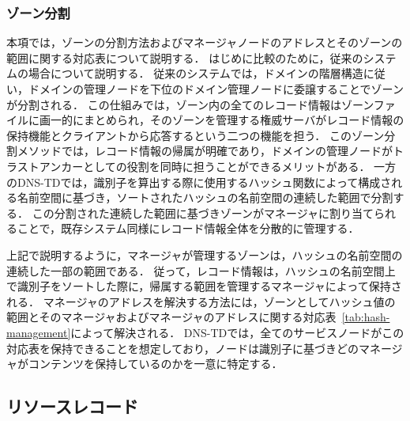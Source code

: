 \subsubsection{ゾーン分割}
本項では，ゾーンの分割方法およびマネージャノードのアドレスとそのゾーンの範囲に関する対応表について説明する．
はじめに比較のために，従来のシステムの場合について説明する．
従来のシステムでは，ドメインの階層構造に従い，ドメインの管理ノードを下位のドメイン管理ノードに委譲することでゾーンが分割される．
この仕組みでは，ゾーン内の全てのレコード情報はゾーンファイルに画一的にまとめられ，そのゾーンを管理する権威サーバがレコード情報の保持機能とクライアントから応答するという二つの機能を担う．
このゾーン分割メソッドでは，レコード情報の帰属が明確であり，ドメインの管理ノードがトラストアンカーとしての役割を同時に担うことができるメリットがある．
一方のDNS-TDでは，識別子を算出する際に使用するハッシュ関数によって構成される名前空間に基づき，ソートされたハッシュの名前空間の連続した範囲で分割する．
この分割された連続した範囲に基づきゾーンがマネージャに割り当てられることで，既存システム同様にレコード情報全体を分散的に管理する．

上記で説明するように，マネージャが管理するゾーンは，ハッシュの名前空間の連続した一部の範囲である．
従って，レコード情報は，ハッシュの名前空間上で識別子をソートした際に，帰属する範囲を管理するマネージャによって保持される．
マネージャのアドレスを解決する方法には，ゾーンとしてハッシュ値の範囲とそのマネージャおよびマネージャのアドレスに関する対応表~\ref{tab:hash-management}によって解決される．
DNS-TDでは，全てのサービスノードがこの対応表を保持できることを想定しており，ノードは識別子に基づきどのマネージャがコンテンツを保持しているのかを一意に特定する．


\subsection{リソースレコード}
